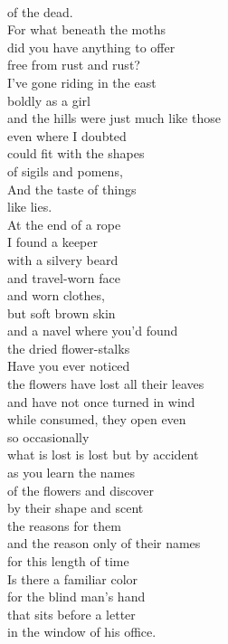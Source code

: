 \documentclass[smalldemyvopaper,11pt,twoside,onecolumn,openright,extrafontsizes]{memoir}
\begin{document}
\\of the dead.
\\For what beneath the moths
\\did you have anything to offer
\\free from rust and rust?
\\I've gone riding in the east
\\boldly as a girl
\\and the hills were just much like those
\\even where I doubted
\\could fit with the shapes
\\of sigils and pomens,
\\And the taste of things
\\like lies.
\\At the end of a rope
\\I found a keeper
\\with a silvery beard
\\and travel-worn face
\\and worn clothes,
\\but soft brown skin
\\and a navel where you'd found
\\the dried flower-stalks
\\Have you ever noticed
\\the flowers have lost all their leaves
\\and have not once turned in wind
\\while consumed, they open even
\\so occasionally
\\what is lost is lost but by accident
\\as you learn the names
\\of the flowers and discover
\\by their shape and scent
\\the reasons for them
\\and the reason only of their names
\\for this length of time
\\Is there a familiar color
\\for the blind man's hand
\\that sits before a letter
\\in the window of his office.
\end{document}
